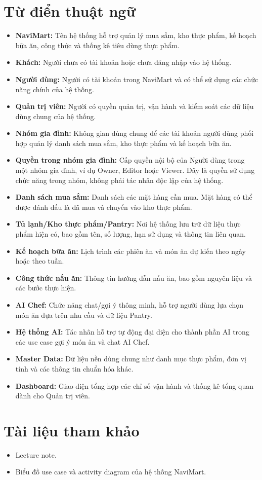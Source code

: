 \section{Từ điển thuật ngữ}
\begin{itemize}
    \item \textbf{NaviMart:} Tên hệ thống hỗ trợ quản lý mua sắm, kho thực phẩm, kế hoạch bữa ăn, công thức và thống kê tiêu dùng thực phẩm.
    \item \textbf{Khách:} Người chưa có tài khoản hoặc chưa đăng nhập vào hệ thống.
    \item \textbf{Người dùng:} Người có tài khoản trong NaviMart và có thể sử dụng các chức năng chính của hệ thống.
    \item \textbf{Quản trị viên:} Người có quyền quản trị, vận hành và kiểm soát các dữ liệu dùng chung của hệ thống.
    \item \textbf{Nhóm gia đình:} Không gian dùng chung để các tài khoản người dùng phối hợp quản lý danh sách mua sắm, kho thực phẩm và kế hoạch bữa ăn.
    \item \textbf{Quyền trong nhóm gia đình:} Cấp quyền nội bộ của Người dùng trong một nhóm gia đình, ví dụ Owner, Editor hoặc Viewer. Đây là quyền sử dụng chức năng trong nhóm, không phải tác nhân độc lập của hệ thống.
    \item \textbf{Danh sách mua sắm:} Danh sách các mặt hàng cần mua. Mặt hàng có thể được đánh dấu là đã mua và chuyển vào kho thực phẩm.
    \item \textbf{Tủ lạnh/Kho thực phẩm/Pantry:} Nơi hệ thống lưu trữ dữ liệu thực phẩm hiện có, bao gồm tên, số lượng, hạn sử dụng và thông tin liên quan.
    \item \textbf{Kế hoạch bữa ăn:} Lịch trình các phiên ăn và món ăn dự kiến theo ngày hoặc theo tuần.
    \item \textbf{Công thức nấu ăn:} Thông tin hướng dẫn nấu ăn, bao gồm nguyên liệu và các bước thực hiện.
    \item \textbf{AI Chef:} Chức năng chat/gợi ý thông minh, hỗ trợ người dùng lựa chọn món ăn dựa trên nhu cầu và dữ liệu Pantry.
    \item \textbf{Hệ thống AI:} Tác nhân hỗ trợ tự động đại diện cho thành phần AI trong các use case gợi ý món ăn và chat AI Chef.
    \item \textbf{Master Data:} Dữ liệu nền dùng chung như danh mục thực phẩm, đơn vị tính và các thông tin chuẩn hóa khác.
    \item \textbf{Dashboard:} Giao diện tổng hợp các chỉ số vận hành và thống kê tổng quan dành cho Quản trị viên.
\end{itemize}

\section{Tài liệu tham khảo}
\begin{itemize}
    \item Lecture note.
    \item Biểu đồ use case và activity diagram của hệ thống NaviMart.
\end{itemize}
